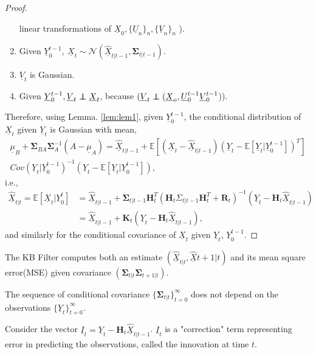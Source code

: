 \documentclass[a4paper,english,12pt]{article}
\newcommand\independent{\protect\mathpalette{\protect\independenT}{\perp}}
\def\independenT#1#2{\mathrel{\rlap{$#1#2$}\mkern2mu{#1#2}}}
\begin{document}
\begin{proof}
\begin{enumerate}
  linear transformations of $\underline{X}_0, \{\underline{U}_n\}_n, \{\underline{V}_n\}_n$ ).
  \item Given $\underline{Y}_0^{t-1},~\underline{X}_t\sim\mathcal{N}(\underline{\hat{X}}_{t|t-1}, \mathbf{\Sigma}_{t|t-1})$.
  \item $\underline{V}_t$ is Gaussian.
  \item Given $\underline{Y}_0^{t-1}, \underline{V}_t\independent\underline{X}_t$, because $( \underline{V}_t\independent(\underline{X}_o, \underline{U}_0^{t-1}
  \underline{V}_0^{t-1}$)).
 \end{enumerate}
 Therefore, using Lemma. \ref{lem:lem1}, given $\underline{Y}_0^{t-1}$, 
 the conditional distribution of $\underline{X}_t$ given $\underline{Y}_t$ is Gaussian with mean,
 \begin{multline*}
 \underline{\mu}_B+ \mathbf{\Sigma}_{BA}\mathbf{\Sigma}_A^{-1}(A-\underline{\mu}_A)=\underline{\hat{X}}_{t|t-1}+\mathbb{E}[(\underline{X}_t-\underline{\hat{X}}_{t|t-1})(\underline{Y}_t-\mathbb{E}[\underline{Y}_t|\underline{Y}_0^{t-1}])^T]\\
 Cov(\underline{Y}_t|\underline{Y}_0^{t-1})^{-1}(\underline{Y}_t-\mathbb{E}[\underline{Y}_t|\underline{Y}_0^{t-1}]),
 \end{multline*}
 i.e.,
 \begin{align*}
 \underline{\hat{X}}_{t|t}=\mathbb{E}[\underline{X}_{t}|\underline{Y}_0^t]& =\underline{\hat{X}}_{t|t-1}+\mathbf{\Sigma}_{t|t-1}\textbf{H}_t^T(\textbf{H}_t\Sigma_{t|t-1}\textbf{H}_t^T+\textbf{R}_t)^{-1}
 (\underline{Y}_t-\textbf{H}_t\underline{\hat{X}}_{t|t-1})\\
&=\underline{\hat{X}}_{t|t-1}+\textbf{K}_t(\underline{Y}_t-\textbf{H}_t\underline{\hat{X}}_{t|t-1}),
  \end{align*}
 and similarly for the conditional covariance of $\underline{X}_t$ given $\underline{Y}_t$, $\underline{Y}_0^{t-1}$.
\end{proof}
\begin{note}
The KB Filter computes both an estimate $(\underline{\hat{X}}_{t|t},\underline{\hat{X}}{t+1|t})$
and its mean square error(MSE) given covariance $(\mathbf{\Sigma}_{t|t}\mathbf{\Sigma}_{t+1|t})$.
\end{note}
\begin{note}
The sequence of conditional covariance $\{\mathbf{\Sigma}_{t|t}\}_{t=0}^\infty$ does not
 depend on the observations $\{\underline{Y}_t\}_{t=0}^\infty$.
\end{note}
Consider the vector $\underline{I}_t=\underline{Y}_t-\textbf{H}_t\underline{\hat{X}}_{t|t-1}$. $\underline{I}_t$ is a "correction" term representing error in predicting the observations, called the innovation at time $t$.
\end{document}
